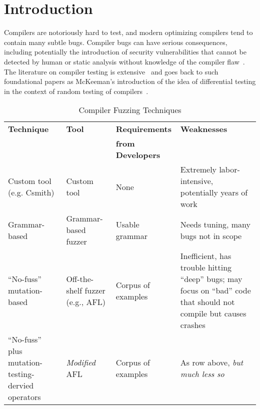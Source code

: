 \section{Introduction}

Compilers are notoriously hard to test, and modern optimizing
compilers tend to contain many subtle bugs.  Compiler bugs can have
serious consequences, including potentially the introduction of
security vulnerabilities that cannot be detected by human or static
analysis without knowledge of the compiler flaw~\cite{CompBug}.   The
literature on compiler testing is extensive~\cite{chen2020survey} and
goes back to such foundational papers as McKeeman's introduction of
the idea of differential testing in the context of random testing of
compilers~\cite{Differential}.

\begin{table*}
\centering
\begin{tabular}{p{45mm}p{30mm}p{30mm}p{45mm}}
\toprule
\bf Technique & \bf Tool & \bf Requirements    & \bf Weaknesses \\
              &          & \bf from Developers &                \\
\rowcolor{LLGray}
Custom tool (e.g. Csmith)  
& Custom tool 
& None 
& Extremely labor-intensive, potentially years of work
\\
Grammar-based              
& Grammar-based fuzzer             
& Usable grammar 
& Needs tuning, many bugs not in scope 
\\
\rowcolor{LLGray}
``No-fuss'' mutation-based 
& Off-the-shelf fuzzer (e.g., AFL) 
& Corpus of examples 
& Inefficient, has trouble hitting ``deep'' bugs; may focus on ``bad'' code that should not compile but causes crashes 
  \\
``No-fuss'' plus mutation-testing-dervied operators & \emph{Modified} 
                                    AFL & Corpus of
                                                             examples
                                               & As row above, \emph{but much less
                                                 so}\\
\bottomrule
\end{tabular}
\caption{Compiler Fuzzing Techniques}
\label{tab:techniques}
\end{table*}

